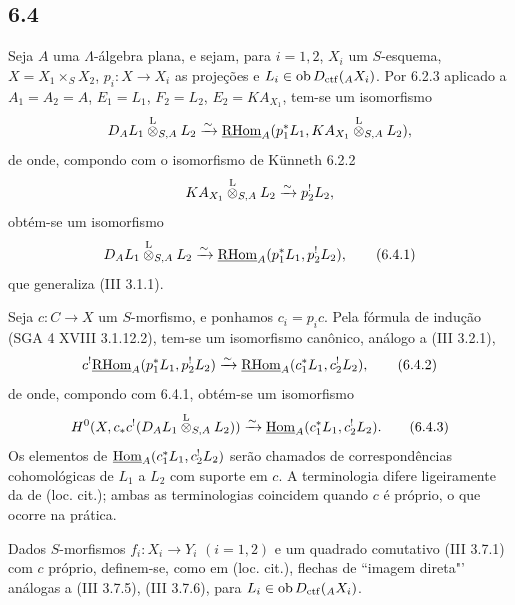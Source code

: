 \subsection*{6.4}
Seja $A$ uma $\Lambda$-álgebra plana, e sejam, para $i=1,2$, $X_i$ um $S$-esquema, $X=X_1\times_SX_2$, $p_i:X\to X_i$ as projeções e $L_i\in\operatorname{ob} D_{\mathrm{ctf}}({}_AX_i)$. Por 6.2.3 aplicado a $A_1=A_2=A$, $E_1=L_1$, $F_2=L_2$, $E_2=KA_{X_1}$, tem-se um isomorfismo
\[
D_A L_1\overset{\mathrm L}{\otimes}_{S,A}L_2
\xrightarrow{\sim}
\underline{\mathrm{RHom}}_A(p_1^*L_1,KA_{X_1}\overset{\mathrm L}{\otimes}_{S,A}L_2),
\]
de onde, compondo com o isomorfismo de Künneth 6.2.2
\[
KA_{X_1}\overset{\mathrm L}{\otimes}_{S,A}L_2\xrightarrow{\sim}p_2^!L_2,
\]
obtém-se um isomorfismo
\begin{equation}
D_AL_1\overset{\mathrm L}{\otimes}_{S,A}L_2
\xrightarrow{\sim}
\underline{\mathrm{RHom}}_A(p_1^*L_1,p_2^!L_2),
\tag{6.4.1}
\end{equation}
que generaliza (III 3.1.1).

Seja $c:C\to X$ um $S$-morfismo, e ponhamos $c_i=p_ic$. Pela fórmula de indução (SGA 4 XVIII 3.1.12.2), tem-se um isomorfismo canônico, análogo a (III 3.2.1),
\begin{equation}
c^!\underline{\mathrm{RHom}}_A(p_1^*L_1,p_2^!L_2)
\xrightarrow{\sim}
\underline{\mathrm{RHom}}_A(c_1^*L_1,c_2^!L_2),
\tag{6.4.2}
\end{equation}
de onde, compondo com 6.4.1, obtém-se um isomorfismo
\begin{equation}
H^0(X,c_*c^!(D_AL_1\overset{\mathrm L}{\otimes}_{S,A}L_2))
\xrightarrow{\sim}
\underline{\operatorname{Hom}}_A(c_1^*L_1,c_2^!L_2).
\tag{6.4.3}
\end{equation}
Os elementos de $\underline{\operatorname{Hom}}_A(c_1^*L_1,c_2^!L_2)$ serão chamados de correspondências cohomológicas de $L_1$ a $L_2$ com suporte em $c$. A terminologia difere ligeiramente da de (loc. cit.); ambas as terminologias coincidem quando $c$ é próprio, o que ocorre na prática.

Dados $S$-morfismos $f_i:X_i\to Y_i$ $(i=1,2)$ e um quadrado comutativo (III 3.7.1) com $c$ próprio, definem-se, como em (loc. cit.), flechas de ``imagem direta"' análogas a (III 3.7.5), (III 3.7.6), para $L_i\in\operatorname{ob} D_{\mathrm{ctf}}({}_AX_i)$.
